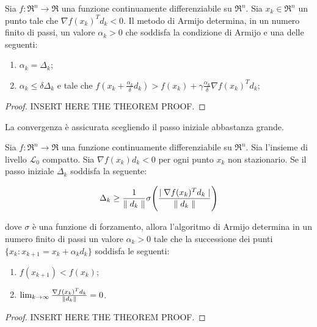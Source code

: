 \begin{theorem}
	\label{thm:methods.armijo.termination}
	Sia $f:\Re^{n}\rightarrow\Re$ una funzione continuamente differenziabile su
	$\Re^{n}$. Sia $x_{k}\in\Re^{n}$ un punto tale che $\nabla f(x_{k})^{T}d_{k}<0$.
	Il metodo di Armijo determina, in un numero finito di passi, un valore
	$\alpha_k>0$ che soddisfa la condizione di Armijo e una delle seguenti:

	\begin{enumerate}
		\item $\alpha_{k}=\Delta_{k}$;

		\item $\alpha_{k}\leq\delta\Delta_{k}$ e tale che
		$f(x_{k}+\frac{\alpha_{k}}{\delta}d_{k})
		>
		f(x_{k})+\gamma\frac{\alpha_{k}}{\delta}\nabla f(x_{k})^{T}d_{k}$;
	\end{enumerate}

	\begin{proof}
		INSERT HERE THE THEOREM PROOF.
	\end{proof}
\end{theorem}

La convergenza è assicurata scegliendo il passo iniziale abbastanza grande.

\begin{theorem}
	\label{thm:methods.armijo.convergence}
	Sia $f:\Re^{n}\rightarrow\Re$ una funzione continuamente differenziabile su
	$\Re^{n}$. Sia l'insieme di livello $\mathcal{L}_{0}$ compatto. 	Sia $\nabla f(x_{k})d_{k}<0$ per ogni punto $x_{k}$ non stazionario. Se il passo iniziale $\Delta_{k}$ soddisfa la seguente:

	\begin{equation}
	\label{eqn:methods.armijo.convergence}
	\Delta_{k}
	\geq
	\frac{1}{\parallel d_{k} \parallel}\sigma\Bigg(\frac{\mid \nabla f(x_{k})^{T}d_{k} \mid}{\parallel d_{k} \parallel}\Bigg)
\end{equation}

dove $\sigma$ è una funzione di forzamento, allora l'algoritmo di Armijo
determina in un numero finito di passi un valore $\alpha_{k}>0$ tale che la
successione dei punti $\{x_{k}:x_{k+1}=x_{k}+\alpha_{k}d_{k}\}$ soddisfa le
seguenti:

\begin{enumerate}
	\item $f(x_{k+1})<f(x_{k})$;

	\item $\lim_{k\rightarrow\infty}\frac{\nabla f(x_{k})^{T}d_{k}}{\parallel d_{k} \parallel}=0$.
\end{enumerate}

\begin{proof}
	INSERT HERE THE THEOREM PROOF.
\end{proof}
\end{theorem}

